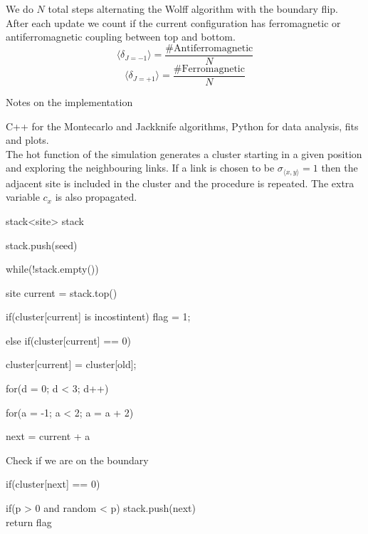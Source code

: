 \documentclass[12pt,handout]{beamer}
\begin{document}
\begin{frame}
\begin{center}
We do $N$ total steps alternating the Wolff algorithm with the boundary flip.\\
\vspace{20pt}
After each update we count if the current configuration has ferromagnetic or antiferromagnetic coupling between top and bottom.\\ 
\[
\langle \delta_{J = -1} \rangle = \frac{\# \text{Antiferromagnetic}}{N}
\]
\[
\langle \delta_{J = +1} \rangle = \frac{\# \text{Ferromagnetic}}{N}
\]

\end{center}
\end{frame}


\begin{frame}{Notes on the implementation}
\begin{center}

C++ for the Montecarlo and Jackknife algorithms, Python for data analysis, fits and plots.\\
\vspace{20pt}
The hot function of the simulation generates a cluster starting in a given position and exploring the neighbouring links. If a link is chosen to be $\sigma_{\langle x, y \rangle} = 1$ then the adjacent site is included in the cluster and the procedure is repeated. The extra variable $c_x$ is also propagated.
\end{center}
\end{frame}


\begin{frame}

stack<site> stack

stack.push(seed)

while(!stack.empty())

\quad site current = stack.top()

\quad if(cluster[current] is incostintent) flag = 1;

\quad else if(cluster[current] == 0)

\quad \quad cluster[current] = cluster[old];

\quad \quad for(d = 0; d < 3; d++) 

\quad \quad \quad for(a = -1; a < 2; a = a + 2) 

\quad \quad \quad next = current + a

\quad \quad \quad Check if we are on the boundary
				
\quad \quad \quad if(cluster[next] == 0)

\quad \quad \quad \quad if(p > 0 and random < p) stack.push(next)\\
return flag

\end{frame}
\end{document}
